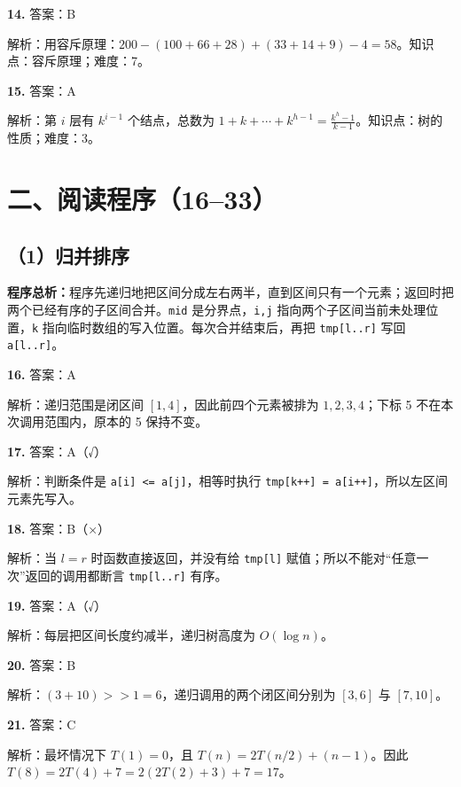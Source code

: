 \documentclass[a4paper]{ctexart}
\newcommand{\ans}[2]{\noindent\textbf{#1} \quad 答案：#2\par}
\newcommand{\expn}[1]{\hspace*{1.5em} 解析：#1\par}
\newcommand{\overview}[1]{\par\smallskip\noindent\textbf{程序总析：}#1\par\smallskip}
\begin{document}
\ans{14.}{B}
\expn{用容斥原理：$200-(100+66+28)+(33+14+9)-4=58$。知识点：容斥原理；难度：7。}
\ans{15.}{A}
\expn{第 $i$ 层有 $k^{i-1}$ 个结点，总数为 $1+k+\cdots+k^{h-1}=\frac{k^h-1}{k-1}$。知识点：树的性质；难度：3。}

\section*{二、阅读程序（16--33）}
\subsection*{（1）归并排序}
\overview{程序先递归地把区间分成左右两半，直到区间只有一个元素；返回时把两个已经有序的子区间合并。\texttt{mid} 是分界点，\texttt{i,j} 指向两个子区间当前未处理位置，\texttt{k} 指向临时数组的写入位置。每次合并结束后，再把 \texttt{tmp[l..r]} 写回 \texttt{a[l..r]}。}
\begin{center}
\end{center}
\ans{16.}{A}\expn{递归范围是闭区间 $[1,4]$，因此前四个元素被排为 $1,2,3,4$；下标 5 不在本次调用范围内，原本的 5 保持不变。}
\ans{17.}{A（√）}\expn{判断条件是 \texttt{a[i] <= a[j]}，相等时执行 \texttt{tmp[k++] = a[i++]}，所以左区间元素先写入。}
\ans{18.}{B（×）}\expn{当 $l=r$ 时函数直接返回，并没有给 \texttt{tmp[l]} 赋值；所以不能对“任意一次”返回的调用都断言 \texttt{tmp[l..r]} 有序。}
\ans{19.}{A（√）}\expn{每层把区间长度约减半，递归树高度为 $O(\log n)$。}
\ans{20.}{B}\expn{$(3+10)>>1=6$，递归调用的两个闭区间分别为 $[3,6]$ 与 $[7,10]$。}
\ans{21.}{C}\expn{最坏情况下 $T(1)=0$，且 $T(n)=2T(n/2)+(n-1)$。因此 $T(8)=2T(4)+7=2(2T(2)+3)+7=17$。}
\end{document}
